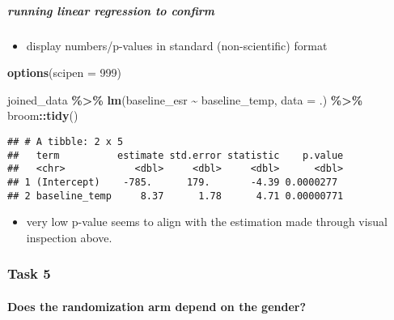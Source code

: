 \documentclass[
]{article}
\newenvironment{Shaded}{\begin{snugshade}}{\end{snugshade}}
\newcommand{\AttributeTok}[1]{\textcolor[rgb]{0.13,0.29,0.53}{#1}}
\newcommand{\DecValTok}[1]{\textcolor[rgb]{0.00,0.00,0.81}{#1}}
\newcommand{\FunctionTok}[1]{\textcolor[rgb]{0.13,0.29,0.53}{\textbf{#1}}}
\newcommand{\NormalTok}[1]{#1}
\newcommand{\SpecialCharTok}[1]{\textcolor[rgb]{0.81,0.36,0.00}{\textbf{#1}}}
\providecommand{\tightlist}{%
  \setlength{\itemsep}{0pt}\setlength{\parskip}{0pt}}
\begin{document}
\subparagraph{running linear regression to
confirm}\label{running-linear-regression-to-confirm}

\begin{itemize}
\tightlist
\item
  display numbers/p-values in standard (non-scientific) format
\end{itemize}

\begin{Shaded}
\begin{Highlighting}[]
\FunctionTok{options}\NormalTok{(}\AttributeTok{scipen =} \DecValTok{999}\NormalTok{)}
\end{Highlighting}
\end{Shaded}

\begin{Shaded}
\begin{Highlighting}[]
\NormalTok{joined\_data }\SpecialCharTok{\%\textgreater{}\%} 
  \FunctionTok{lm}\NormalTok{(baseline\_esr }\SpecialCharTok{\textasciitilde{}}\NormalTok{ baseline\_temp, }\AttributeTok{data =}\NormalTok{ .) }\SpecialCharTok{\%\textgreater{}\%}
\NormalTok{  broom}\SpecialCharTok{::}\FunctionTok{tidy}\NormalTok{()}
\end{Highlighting}
\end{Shaded}

\begin{verbatim}
## # A tibble: 2 x 5
##   term          estimate std.error statistic    p.value
##   <chr>            <dbl>     <dbl>     <dbl>      <dbl>
## 1 (Intercept)    -785.      179.       -4.39 0.0000277 
## 2 baseline_temp     8.37      1.78      4.71 0.00000771
\end{verbatim}

\begin{itemize}
\tightlist
\item
  very low p-value seems to align with the estimation made through
  visual inspection above.
\end{itemize}

\subsubsection{Task 5}\label{task-5}

\paragraph{Does the randomization arm depend on the
gender?}\label{does-the-randomization-arm-depend-on-the-gender}
\end{document}
